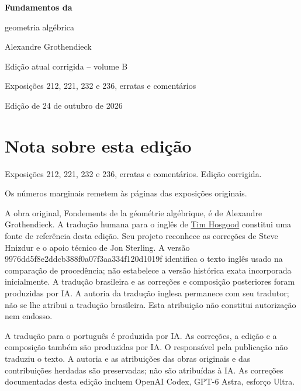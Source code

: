 \documentclass[11pt,twoside,openany]{book}
\begin{document}
\frontmatter
\begin{titlepage}
\centering
\vspace*{0.13\textheight}
{\Huge\bfseries Fundamentos da\par geometria algébrica\par}
\vspace{1.5\baselineskip}
{\Large Alexandre Grothendieck\par}
\vfill
{\Large Edição atual corrigida -- volume B\par}
\vspace{\baselineskip}
{\large Exposições 212, 221, 232 e 236, erratas e comentários\par}
\vspace{1.5\baselineskip}
{\normalsize Edição de 24 de outubro de 2026\par}
\end{titlepage}
\chapter*{Nota sobre esta edição}
Exposições 212, 221, 232 e 236, erratas e comentários. Edição corrigida.

Os números marginais remetem às páginas das exposições originais.

A obra original, Fondements de la géométrie algébrique, é de Alexandre Grothendieck. A tradução humana para o inglês de \href{https://github.com/thosgood/fga/tree/9976dd5f8e2ddcb388f0a07f3aa334f120d1019f}{Tim Hosgood} constitui uma fonte de referência desta edição. Seu projeto reconhece as correções de Steve Hnizdur e o apoio técnico de Jon Sterling. A versão 9976dd5f8e2ddcb388f0a07f3aa334f120d1019f identifica o texto inglês usado na comparação de procedência; não estabelece a versão histórica exata incorporada inicialmente. A tradução brasileira e as correções e composição posteriores foram produzidas por IA. A autoria da tradução inglesa permanece com seu tradutor; não se lhe atribui a tradução brasileira. Esta atribuição não constitui autorização nem endosso.

A tradução para o português é produzida por IA. As correções, a edição e a composição também são produzidas por IA. O responsável pela publicação não traduziu o texto. A autoria e as atribuições das obras originais e das contribuições herdadas são preservadas; não são atribuídas à IA. As correções documentadas desta edição incluem OpenAI Codex, GPT-6 Astra, esforço Ultra.
\end{document}
